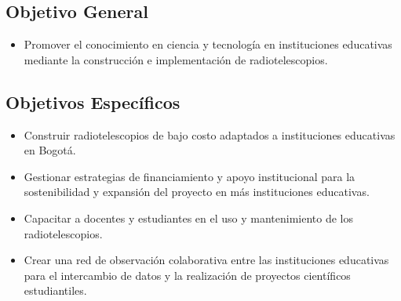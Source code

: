 \subsection{Objetivo General}
\begin{itemize}
    \item Promover el conocimiento en ciencia y tecnología en instituciones educativas mediante la
    construcción e implementación de radiotelescopios.
\end{itemize}

\subsection{Objetivos Específicos}
\begin{itemize}
    \item  Construir radiotelescopios de bajo costo adaptados a instituciones educativas en Bogotá.
     \item Gestionar estrategias de financiamiento y apoyo institucional para la sostenibilidad y 
     expansión del proyecto en más instituciones educativas.
    \item Capacitar a docentes y estudiantes en el uso y mantenimiento de los radiotelescopios.
    \item Crear una red de observación colaborativa entre las instituciones educativas para el intercambio 
    de datos y la realización de proyectos científicos estudiantiles.
\end{itemize}
